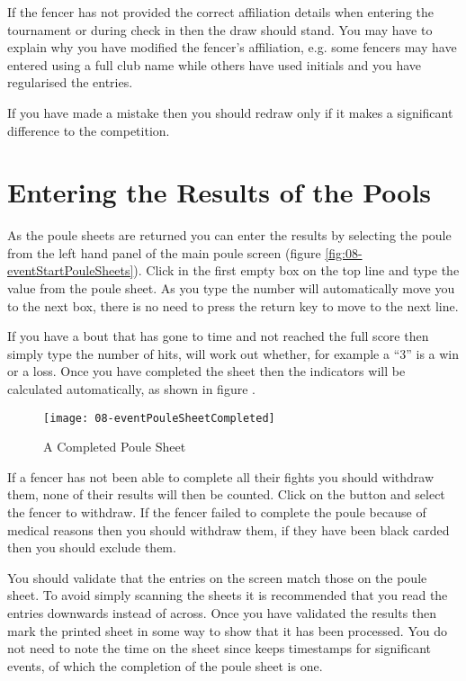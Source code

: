 \documentclass[a4paper,11pt]{memoir}
\begin{document}
If the fencer has not provided the correct affiliation details when entering the tournament or during check in then the draw should stand. 
You may have to explain why you have modified the fencer's affiliation, e.g. some fencers may have entered using a full club name while others have used initials and you have regularised the entries.

If you have made a mistake then you should redraw only if it makes a significant difference to the competition.

\section{Entering the Results of the Pools}

As the poule sheets are returned you can enter the results by selecting the poule from the left hand panel of the main poule screen (figure \ref{fig:08-eventStartPouleSheets}). Click in the first empty box on the top line and type the value from the poule sheet. As you type the number \fencingtime{} will automatically move you to the next box, there is no need to press the return key to move to the next line.

If you have a bout that has gone to time and not reached the full score then simply type the number of hits, \fencingtime{} will work out whether, for example a “3” is a win or a loss. Once you have completed the sheet then the \gls{indicators} will be calculated automatically, as shown in figure .

\begin{figure}[!ht]
 \centering
 \texttt{[image: 08-eventPouleSheetCompleted]}
 \caption{A Completed Poule Sheet} \label{fig:08-eventPouleSheetCompleted}
\end{figure}

If a fencer has not been able to complete all their fights you should withdraw them, none of their results will then be counted. Click on the  button and select the fencer to withdraw. If the fencer failed to complete the poule because of medical reasons then you should withdraw them, if they have been black carded then you should exclude them.

You should validate that the entries on the screen match those on the poule sheet. To avoid simply scanning the sheets it is recommended that you read the entries downwards instead of across. Once you have validated the results then mark the printed sheet in some way to show that it has been processed. You do not need to note the time on the sheet since \fencingtime{} keeps timestamps for significant events, of which the completion of the poule sheet is one.
\end{document}
